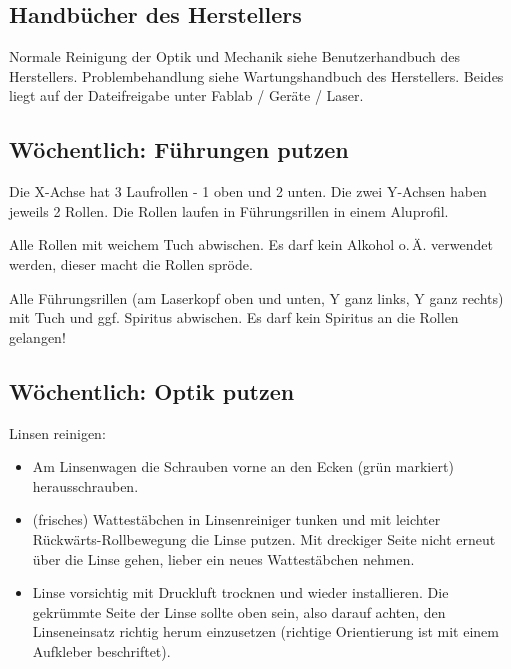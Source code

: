 \documentclass{\basedir/fablab-document}
\begin{document}
	\subsection{Handbücher des Herstellers}
	Normale Reinigung der Optik und Mechanik siehe Benutzerhandbuch des Herstellers. Problembehandlung siehe Wartungshandbuch des Herstellers. Beides liegt auf der Dateifreigabe unter Fablab / Geräte / Laser.

	\subsection{Wöchentlich: Führungen putzen}
	Die X-Achse hat 3 Laufrollen - 1 oben und 2 unten. Die zwei Y-Achsen haben jeweils 2 Rollen. Die Rollen laufen in Führungsrillen in einem Aluprofil.

	Alle Rollen mit weichem Tuch abwischen. Es darf kein Alkohol o.\,Ä. verwendet werden, dieser macht die Rollen spröde.

	Alle Führungsrillen (am Laserkopf oben und unten, Y ganz links, Y ganz rechts) mit Tuch und ggf. Spiritus abwischen. Es darf kein Spiritus an die Rollen gelangen!

	\subsection{Wöchentlich: Optik putzen}

	Linsen reinigen:
	\begin{itemize}
		\item Am Linsenwagen die Schrauben vorne an den Ecken (grün markiert) herausschrauben.
		\item (frisches) Wattestäbchen in Linsenreiniger tunken und mit leichter Rückwärts-Rollbewegung die Linse putzen. Mit dreckiger Seite nicht erneut über die Linse gehen, lieber ein neues Wattestäbchen nehmen.
		\item Linse vorsichtig mit Druckluft trocknen und wieder installieren. Die gekrümmte Seite der Linse sollte oben sein, also darauf achten, den Linseneinsatz richtig herum einzusetzen (richtige Orientierung ist mit einem Aufkleber beschriftet).
	\end{itemize}
\end{document}
